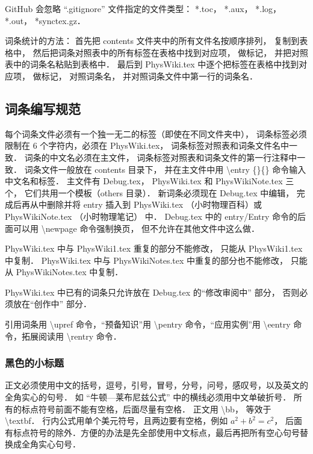 GitHub 会忽略 “.gitignore” 文件指定的文件类型： *.toc， *.aux， *.log， *.out， *synctex.gz．

词条统计的方法： 首先把 contents 文件夹中的所有文件名按顺序排列， 复制到表格中， 然后把词条对照表中的所有标签在表格中找到对应项， 做标记， 并把对照表中的词条名粘贴到表格中． 最后到 PhysWiki.tex 中逐个把标签在表格中找到对应项， 做标记， 对照词条名， 并对照词条文件中第一行的词条名．

\subsection{词条编写规范}

每个词条文件必须有一个独一无二的标签（即使在不同文件夹中）， 词条标签必须限制在 6 个字符内，必须在 PhysWiki.tex， 词条标签对照表和词条文件名中一致． 词条的中文名必须在主文件， 词条标签对照表和词条文件的第一行注释中一致． 词条文件一般放在 contents 目录下， 并在主文件中用 \textbackslash entry \{\}\{\} 命令输入中文名和标签． 主文件有 Debug.tex， PhysWiki.tex 和 PhysWikiNote.tex 三个， 它们共用一个模板（others 目录）． 新词条必须现在 Debug.tex 中编辑， 完成后再从中删除并将 entry 插入到 PhysWiki.tex （小时物理百科）或 PhysWikiNote.tex （小时物理笔记） 中． Debug.tex 中的 entry/Entry 命令的后面可以用 \textbackslash newpage 命令强制换页， 但不允许在其他文件中这么做．

PhysWiki.tex 中与 PhysWiki1.tex 重复的部分不能修改， 只能从 PhysWiki1.tex 中复制． PhysWiki.tex 中与 PhysWikiNotes.tex 中重复的部分也不能修改， 只能从 PhysWikiNotes.tex 中复制．

PhysWiki.tex 中已有的词条只允许放在 Debug.tex 的“修改审阅中” 部分， 否则必须放在“创作中” 部分．

引用词条用 \textbackslash upref 命令，“预备知识”用 \textbackslash pentry 命令，“应用实例”用 \textbackslash eentry 命令，拓展阅读用 \textbackslash rentry 命令．

\subsubsection{黑色的小标题}

正文必须使用中文的括号，逗号，引号，冒号，分号，问号，感叹号，以及英文的全角实心的句号． 如 “牛顿—莱布尼兹公式” 中的横线必须用中文单破折号． 所有的标点符号前面不能有空格，后面尽量有空格． 正文用 \textbackslash bb， 等效于 \textbackslash textbf． 行内公式用单个美元符号，且两边要有空格，例如 $a^2+b^2=c^2$， 后面有标点符号的除外．方便的办法是先全部使用中文标点，最后再把所有空心句号替换成全角实心句号．

